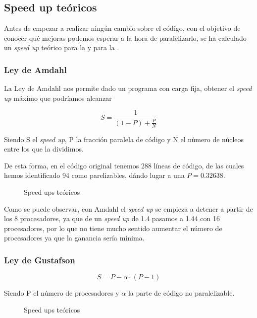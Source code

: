 \documentclass[12pt]{report} %
\begin{document}
\subsection{Speed up teóricos}

Antes de empezar a realizar ningún cambio sobre el código, con el objetivo de conocer qué mejoras
podemos esperar a la hora de paralelizarlo, se ha calculado un \textit{speed up} teórico para
la  y para la .

\subsubsection{Ley de Amdahl}
\label{sec:Amdahl}

La Ley de Amdahl nos permite dado un programa con carga fija, obtener el \textit{speed up} máximo que podríamos alcanzar

\[ S = \frac{1}{(1 - P) + \frac{P}{N}} \]

Siendo S el \textit{speed up}, P la fracción paralela de código y N el número de núcleos entre
los que la dividimos.

De esta forma, en el código original tenemos 288 líneas de código, de las cuales hemos identificado
94 como parelizables, dándo lugar a una $P = 0.32638$.

\begin{figure}[H]
    \makebox[\textwidth][c]{
        
    }
    \caption{Speed ups teóricos}
    \label{fig:ley_amdahl}
\end{figure}

Como se puede observar, con Amdahl el \textit{speed up} se empieza a detener a partir de los 8 procesadores,
ya que de un \textit{speed up} de 1.4 pasamos a 1.44 con 16 procesadores, por lo que no tiene mucho sentido
aumentar el número de procesadores ya que la ganancia sería mínima.


\subsubsection{Ley de Gustafson}
\label{sec:Gustafson}

\[ S = P - \alpha \cdot (P - 1)\]

Siendo P el número de procesadores y $\alpha$ la parte de código no paralelizable.

\begin{figure}[H]
    \makebox[\textwidth][c]{
        
    }
    \caption{Speed ups teóricos}
    \label{fig:ley_amdahl}
\end{figure}
\end{document}
